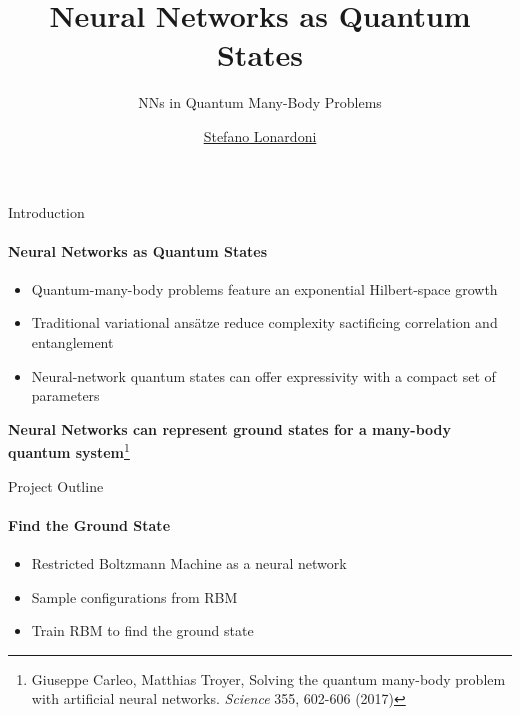 \documentclass{beamer}
\title{Neural Networks as Quantum States}
\subtitle{NNs in Quantum Many-Body Problems}
\author{\href{mailto:stefano.lonardoni1@studenti.unimi.it}{Stefano Lonardoni}}
\begin{document}
\maketitle

\begin{frame}{Introduction}
\framesubtitle{Neural Networks as Quantum States}
\begin{itemize}
	\item Quantum-many-body problems feature an exponential Hilbert-space growth
	\item Traditional variational ansätze reduce complexity sactificing correlation and entanglement
	\item Neural-network quantum states can offer expressivity with a compact set of parameters
\end{itemize}

\textbf{Neural Networks can represent ground states for a many-body quantum system}\footnote{Giuseppe Carleo, Matthias Troyer, Solving the quantum many-body problem with artificial neural networks. \textit{Science} 355, 602-606 (2017)}

\end{frame}

\begin{chapter}{}{Project Outline}
\framesubtitle{Find the Ground State}
\begin{itemize}
	\item Restricted Boltzmann Machine as a neural network
	\item Sample configurations from RBM
	\item Train RBM to find the ground state
\end{itemize}
\end{chapter}
\end{document}
